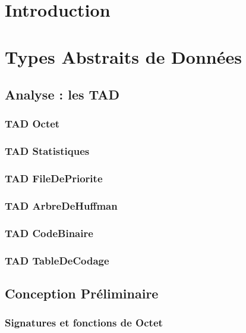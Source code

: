 \documentclass[10pt]{report}
\begin{document}
	\tableofcontents
	\chapter{Introduction}    
    \chapter{Types Abstraits de Données}

        \section{Analyse : les TAD}
            \subsection{TAD Octet}
                
            \subsection{TAD Statistiques}
                
            \subsection{TAD FileDePriorite}
                
            \subsection{TAD ArbreDeHuffman}
                
            \subsection{TAD CodeBinaire}
                
            \subsection{TAD TableDeCodage}
                

        \newpage
        \section{Conception Préliminaire}
            \subsection{Signatures et fonctions de Octet}
                
\end{document}
